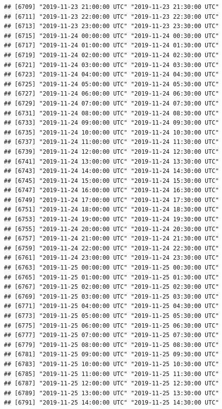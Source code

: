 \documentclass{article}\usepackage[]{graphicx}\usepackage[]{color}
\makeatletter
\newenvironment{kframe}{%
 \def\at@end@of@kframe{}%
 \ifinner\ifhmode%
  \def\at@end@of@kframe{\end{minipage}}%
  \begin{minipage}{\columnwidth}%
 \fi\fi%
 \def\FrameCommand##1{\hskip\@totalleftmargin \hskip-\fboxsep
 \colorbox{shadecolor}{##1}\hskip-\fboxsep
     \hskip-\linewidth \hskip-\@totalleftmargin \hskip\columnwidth}%
 \MakeFramed {\advance\hsize-\width
   \@totalleftmargin\z@ \linewidth\hsize
   \@setminipage}}%
 {\par\unskip\endMakeFramed%
 \at@end@of@kframe}
\newenvironment{knitrout}{}{} %
\makeatother
\begin{document}
\begin{knitrout}
\begin{kframe}
\begin{verbatim}
## [6709] "2019-11-23 21:00:00 UTC" "2019-11-23 21:30:00 UTC"
## [6711] "2019-11-23 22:00:00 UTC" "2019-11-23 22:30:00 UTC"
## [6713] "2019-11-23 23:00:00 UTC" "2019-11-23 23:30:00 UTC"
## [6715] "2019-11-24 00:00:00 UTC" "2019-11-24 00:30:00 UTC"
## [6717] "2019-11-24 01:00:00 UTC" "2019-11-24 01:30:00 UTC"
## [6719] "2019-11-24 02:00:00 UTC" "2019-11-24 02:30:00 UTC"
## [6721] "2019-11-24 03:00:00 UTC" "2019-11-24 03:30:00 UTC"
## [6723] "2019-11-24 04:00:00 UTC" "2019-11-24 04:30:00 UTC"
## [6725] "2019-11-24 05:00:00 UTC" "2019-11-24 05:30:00 UTC"
## [6727] "2019-11-24 06:00:00 UTC" "2019-11-24 06:30:00 UTC"
## [6729] "2019-11-24 07:00:00 UTC" "2019-11-24 07:30:00 UTC"
## [6731] "2019-11-24 08:00:00 UTC" "2019-11-24 08:30:00 UTC"
## [6733] "2019-11-24 09:00:00 UTC" "2019-11-24 09:30:00 UTC"
## [6735] "2019-11-24 10:00:00 UTC" "2019-11-24 10:30:00 UTC"
## [6737] "2019-11-24 11:00:00 UTC" "2019-11-24 11:30:00 UTC"
## [6739] "2019-11-24 12:00:00 UTC" "2019-11-24 12:30:00 UTC"
## [6741] "2019-11-24 13:00:00 UTC" "2019-11-24 13:30:00 UTC"
## [6743] "2019-11-24 14:00:00 UTC" "2019-11-24 14:30:00 UTC"
## [6745] "2019-11-24 15:00:00 UTC" "2019-11-24 15:30:00 UTC"
## [6747] "2019-11-24 16:00:00 UTC" "2019-11-24 16:30:00 UTC"
## [6749] "2019-11-24 17:00:00 UTC" "2019-11-24 17:30:00 UTC"
## [6751] "2019-11-24 18:00:00 UTC" "2019-11-24 18:30:00 UTC"
## [6753] "2019-11-24 19:00:00 UTC" "2019-11-24 19:30:00 UTC"
## [6755] "2019-11-24 20:00:00 UTC" "2019-11-24 20:30:00 UTC"
## [6757] "2019-11-24 21:00:00 UTC" "2019-11-24 21:30:00 UTC"
## [6759] "2019-11-24 22:00:00 UTC" "2019-11-24 22:30:00 UTC"
## [6761] "2019-11-24 23:00:00 UTC" "2019-11-24 23:30:00 UTC"
## [6763] "2019-11-25 00:00:00 UTC" "2019-11-25 00:30:00 UTC"
## [6765] "2019-11-25 01:00:00 UTC" "2019-11-25 01:30:00 UTC"
## [6767] "2019-11-25 02:00:00 UTC" "2019-11-25 02:30:00 UTC"
## [6769] "2019-11-25 03:00:00 UTC" "2019-11-25 03:30:00 UTC"
## [6771] "2019-11-25 04:00:00 UTC" "2019-11-25 04:30:00 UTC"
## [6773] "2019-11-25 05:00:00 UTC" "2019-11-25 05:30:00 UTC"
## [6775] "2019-11-25 06:00:00 UTC" "2019-11-25 06:30:00 UTC"
## [6777] "2019-11-25 07:00:00 UTC" "2019-11-25 07:30:00 UTC"
## [6779] "2019-11-25 08:00:00 UTC" "2019-11-25 08:30:00 UTC"
## [6781] "2019-11-25 09:00:00 UTC" "2019-11-25 09:30:00 UTC"
## [6783] "2019-11-25 10:00:00 UTC" "2019-11-25 10:30:00 UTC"
## [6785] "2019-11-25 11:00:00 UTC" "2019-11-25 11:30:00 UTC"
## [6787] "2019-11-25 12:00:00 UTC" "2019-11-25 12:30:00 UTC"
## [6789] "2019-11-25 13:00:00 UTC" "2019-11-25 13:30:00 UTC"
## [6791] "2019-11-25 14:00:00 UTC" "2019-11-25 14:30:00 UTC"

\end{verbatim}
\end{kframe}
\end{knitrout}
\end{document}
